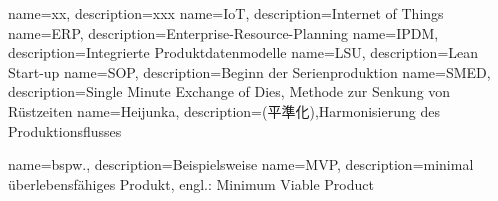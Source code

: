 %
{
  name=xx, 
  description={xxx}
}
%
{
  name=IoT, 
  description={Internet of Things}
}
%
%
{
  name=ERP, 
  description={Enterprise-Resource-Planning}
}
%
{
  name=IPDM, 
  description={Integrierte Produktdatenmodelle}
}
%
{
  name=LSU, 
  description={Lean Start-up}
}
%
{
  name=SOP, 
  description={Beginn der Serienproduktion}
}
%
{
  name=SMED, 
  description={Single Minute Exchange of Dies, Methode zur Senkung von Rüstzeiten}
}
%
{
  name=Heijunka, 
  description={(平準化),Harmonisierung des Produktionsflusses}
}

{
  name=bspw.,
  description={Beispielsweise}
}
%
{  
  name=MVP,
  description={minimal überlebensfähiges Produkt, engl.: Minimum Viable
Product}
}
